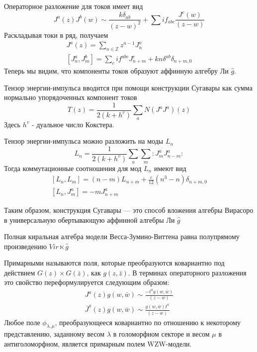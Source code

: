 \documentclass[a4paper,12pt]{article}
\theoremstyle{definition} \newtheorem{Def}{Definition}
\begin{document}
Операторное разложение для токов имеет вид
\begin{equation}
  \label{eq:89}
  J^a(z) J^b(w) \sim \frac{k\delta_{ab}}{(z-w)^2}+\sum i f_{abc}\frac{J^c(w)}{(z-w)}
\end{equation}
Раскладывая токи в ряд, получаем
\begin{equation}
  \label{eq:90}
  \begin{aligned}
    J^a(z)=\sum_{n\in \mathbb Z}z^{n-1}J^a_n\\
    \left[J^a_n,J^b_m\right]=\sum_c i f^{abc}J^c_{n+m}+kn\delta^{ab}\delta_{n+m,0}
  \end{aligned}
\end{equation}
Теперь мы видим, что компоненты токов образуют аффинную алгебру Ли $\hat g$.


Тензор энергии-импульса вводится при помощи конструкции Сугавары как сумма нормально упорядоченных компонент токов
\begin{equation}
  \label{eq:102}
  T(z)=\frac{1}{2(k+h^v)}\sum_a N(J^a J^a)(z)
\end{equation}
Здесь $h^v$ - дуальное число Кокстера.

Тензор энергии-импульса можно разложить на моды $L_n$
\begin{equation}
  \label{eq:91}
  L_n=\frac{1}{2(k+h^v)}\sum_a\sum_m:J^a_m J^a_{n-m}:
\end{equation}
Тогда коммутационные соотношения для мод $L_n$ имеют вид
\begin{equation}
  \label{eq:92}
  \begin{aligned}
    \left[L_n,L_m\right]=(n-m)L_{n+m}+\frac{c}{12}(n^3-n)\delta_{n+m,0}\\
    \left[L_n,J^a_m\right]=-mJ^a_{n+m}
  \end{aligned}
\end{equation}

Таким образом, конструкция Сугавары --- это способ вложения алгебры Вирасоро в универсальную обертывающую аффинной алгебры Ли $\hat{g}$

Полная киральная алгебра модели Весса-Зумино-Виттена равна полупрямому произведению $Vir\ltimes \hat g$

Примарными называются поля, которые преобразуются ковариантно под действием $G(z)\times G(\bar z)$, как $g(z,\bar z)$. В терминах операторного разложения это свойство переформулируется следующим образом:
\begin{equation}
  \label{eq:84}
  \begin{aligned}
    J^a(z)g(w,\bar w)\sim \frac{-t^a g(w,\bar w)}{(z-w)}\\
    \bar J^a(z)g(w,\bar w)\sim \frac{ g(w,\bar w)t^a}{(z-w)}
  \end{aligned}
\end{equation}
Любое поле $\phi_{\lambda,\mu}$, преобразующееся ковариантно по отношению к некоторому представлению, заданному весом $\lambda$ в голоморфном секторе и весом $\mu$ в антиголоморфном, является примарным полем WZW-модели.
\end{document}
